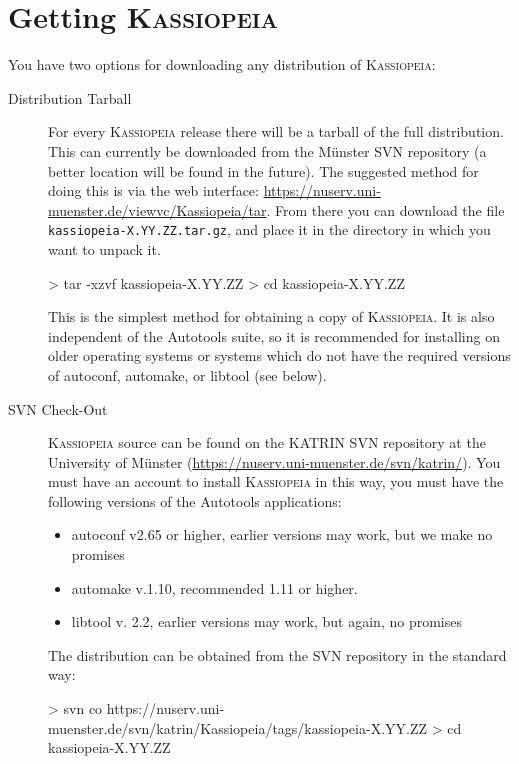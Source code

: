 \section{Getting \textsc{Kassiopeia}}
You have two options for downloading any distribution of \textsc{Kassiopeia}:
\begin{description}
\item[Distribution Tarball]

For every \textsc{Kassiopeia} release there will be a tarball of the full distribution.  This can currently be downloaded from the M\"unster SVN repository (a better location will be found in the future).  The suggested method for doing this is via the web interface: \url{https://nuserv.uni-muenster.de/viewvc/Kassiopeia/tar}.  From there you can download the file \texttt{kassiopeia-X.YY.ZZ.tar.gz}, and place it in the directory in which you want to unpack it.
\begin{DoxyCode}
>  tar -xzvf kassiopeia-X.YY.ZZ
>  cd kassiopeia-X.YY.ZZ
\end{DoxyCode}
This is the simplest method for obtaining a copy of \textsc{Kassiopeia}.  It is also independent of the Autotools suite, so it is recommended for installing on older operating systems or systems which do not have the required versions of autoconf, automake, or libtool (see below).

\item[SVN Check-Out]

\textsc{Kassiopeia} source can be found on the KATRIN SVN repository at the University of M\"unster (\url{https://nuserv.uni-muenster.de/svn/katrin/}).  You must have an account to install \textsc{Kassiopeia} in this way, you must have the following versions of the Autotools applications:
\begin{itemize}
\item autoconf v2.65 or higher, earlier versions may work, but we make no promises
\item automake v.1.10, recommended 1.11 or higher. 
\item libtool v. 2.2, earlier versions may work, but again, no promises 
\end{itemize}

The distribution can be obtained from the SVN repository in the standard way:
\begin{DoxyCode}
>  svn co https://nuserv.uni-muenster.de/svn/katrin/Kassiopeia/tags/kassiopeia-X.YY.ZZ
>  cd kassiopeia-X.YY.ZZ
\end{DoxyCode}

\end{description}


